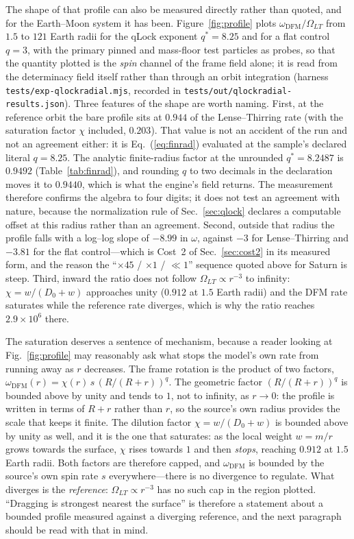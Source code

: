 \documentclass[aps,reprint,amsmath,amssymb,nofootinbib,superscriptaddress,floatfix]{revtex4-2}
\begin{document}
The shape of that profile can also be measured directly rather than
quoted, and for the Earth--Moon system it has been.
Figure~\ref{fig:profile} plots $\omega_{\mathrm{DFM}}/\Omega_{LT}$
from $1.5$ to $121$ Earth radii for the qLock exponent $q^{*}=8.25$
and for a flat control $q=3$, with the primary pinned and mass-floor
test particles as probes, so that the quantity plotted is the
\emph{spin} channel of the frame field alone; it is read from the
determinacy field itself rather than through an orbit integration
(harness \texttt{tests/exp-qlockradial.mjs}, recorded in
\texttt{tests/out/qlockradial-results.json}).
Three features of the shape are worth naming.
First, at the reference orbit the bare profile sits at $0.944$ of the
Lense--Thirring rate (with the saturation factor $\chi$ included,
$0.203$).
That value is not an accident of the run and not an agreement either:
it is Eq.~(\ref{eq:finrad}) evaluated at the sample's declared literal
$q=8.25$.
The analytic finite-radius factor at the unrounded $q^{*}=8.2487$ is
$0.9492$ (Table~\ref{tab:finrad}), and rounding $q$ to two decimals in
the declaration moves it to $0.9440$, which is what the engine's field
returns.
The measurement therefore confirms the algebra to four digits; it does
not test an agreement with nature, because the normalization rule of
Sec.~\ref{sec:qlock} declares a computable offset at this radius rather
than an agreement.
Second, outside that radius the profile falls with a log--log slope of
$-8.99$ in $\omega$, against $-3$ for Lense--Thirring and $-3.81$ for
the flat control---which is Cost~2 of Sec.~\ref{sec:cost2} in its
measured form, and the reason the ``$\times45$ / $\times1$ /
$\ll1$'' sequence quoted above for Saturn is steep.
Third, inward the ratio does not follow $\Omega_{LT}\propto r^{-3}$ to
infinity: $\chi=w/(D_0+w)$ approaches unity ($0.912$ at $1.5$ Earth
radii) and the DFM rate saturates while the reference rate diverges,
which is why the ratio reaches $2.9\times10^{6}$ there.

The saturation deserves a sentence of mechanism, because a reader
looking at Fig.~\ref{fig:profile} may reasonably ask what stops the
model's own rate from running away as $r$ decreases.
The frame rotation is the product of two factors,
$\omega_{\mathrm{DFM}}(r)=\chi(r)\,s\,(R/(R+r))^{q}$.
The geometric factor $(R/(R+r))^{q}$ is bounded above by unity and
tends to $1$, not to infinity, as $r\to0$: the profile is written in
terms of $R+r$ rather than $r$, so the source's own radius provides the
scale that keeps it finite.
The dilution factor $\chi=w/(D_0+w)$ is bounded above by unity as well,
and it is the one that saturates: as the local weight $w=m/r$ grows
towards the surface, $\chi$ rises towards $1$ and then \emph{stops},
reaching $0.912$ at $1.5$ Earth radii.
Both factors are therefore capped, and $\omega_{\mathrm{DFM}}$ is bounded
by the source's own spin rate $s$ everywhere---there is no divergence to
regulate.
What diverges is the \emph{reference}: $\Omega_{LT}\propto r^{-3}$ has
no such cap in the region plotted.
``Dragging is strongest nearest the surface'' is therefore a statement
about a bounded profile measured against a diverging reference, and the
next paragraph should be read with that in mind.
\end{document}

